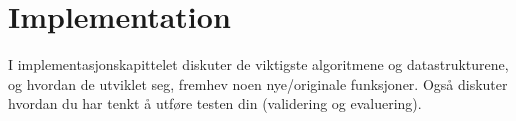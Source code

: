 \chapter{Implementation}

\minitoc

I implementasjonskapittelet diskuter de viktigste algoritmene
og datastrukturene, og hvordan de utviklet seg, fremhev noen
nye/originale funksjoner. Også diskuter hvordan du har
tenkt å utføre testen din (validering og evaluering).

\clearpage

